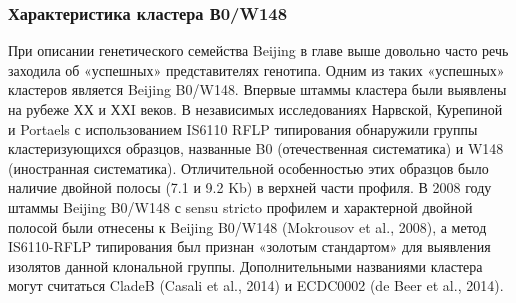 \subsubsection{Характеристика кластера В0/W148}
При описании генетического семейства Beijing в главе выше довольно часто речь заходила об «успешных» представителях генотипа. Одним из таких «успешных» кластеров является Beijing B0/W148. Впервые штаммы кластера были выявлены на рубеже ХХ и ХХI веков. В независимых исследованиях Нарвской, Курепиной и Portaels с использованием IS6110 RFLP типирования обнаружили группы кластеризующихся образцов, названные B0 (отечественная систематика) и W148 (иностранная систематика). Отличительной особенностью этих образцов было наличие двойной полосы (7.1 и 9.2 Kb) в верхней части профиля. В 2008 году штаммы Beijing B0/W148 с sensu stricto профилем и характерной двойной полосой были отнесены к Beijing B0/W148 (Mokrousov et al., 2008), а метод IS6110-RFLP типирования был признан «золотым стандартом» для выявления изолятов данной клональной группы. Дополнительными названиями кластера могут считаться CladeB (Casali et al., 2014) и ECDC0002 (de Beer et al., 2014).

